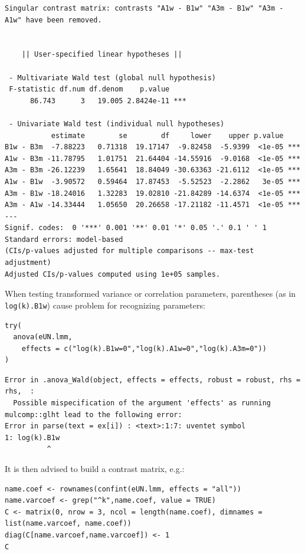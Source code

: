 \documentclass[12pt]{article}
\begin{document}
\begin{verbatim}
Singular contrast matrix: contrasts "A1w - B1w" "A3m - B1w" "A3m - A1w" have been removed. 


	|| User-specified linear hypotheses || 

 - Multivariate Wald test (global null hypothesis)
 F-statistic df.num df.denom    p.value    
      86.743      3   19.005 2.8424e-11 ***

 - Univariate Wald test (individual null hypotheses) 
           estimate        se        df     lower    upper p.value    
B1w - B3m  -7.88223   0.71318  19.17147  -9.82458  -5.9399  <1e-05 ***
A1w - B3m -11.78795   1.01751  21.64404 -14.55916  -9.0168  <1e-05 ***
A3m - B3m -26.12239   1.65641  18.84049 -30.63363 -21.6112  <1e-05 ***
A1w - B1w  -3.90572   0.59464  17.87453  -5.52523  -2.2862   3e-05 ***
A3m - B1w -18.24016   1.32283  19.02810 -21.84289 -14.6374  <1e-05 ***
A3m - A1w -14.33444   1.05650  20.26658 -17.21182 -11.4571  <1e-05 ***
---
Signif. codes:  0 '***' 0.001 '**' 0.01 '*' 0.05 '.' 0.1 ' ' 1
Standard errors: model-based
(CIs/p-values adjusted for multiple comparisons -- max-test adjustment)
Adjusted CIs/p-values computed using 1e+05 samples.
\end{verbatim}


When testing transformed variance or correlation parameters,
parentheses (as in \texttt{log(k).B1w}) cause problem for recognizing
parameters:
\lstset{language=r,label= ,caption= ,captionpos=b,numbers=none}
\begin{lstlisting}
try(
  anova(eUN.lmm,
	effects = c("log(k).B1w=0","log(k).A1w=0","log(k).A3m=0"))
)
\end{lstlisting}

\begin{verbatim}
Error in .anova_Wald(object, effects = effects, robust = robust, rhs = rhs,  : 
  Possible mispecification of the argument 'effects' as running mulcomp::glht lead to the following error: 
Error in parse(text = ex[i]) : <text>:1:7: uventet symbol
1: log(k).B1w
          ^
\end{verbatim}


It is then advised to build a contrast matrix, e.g.:
\lstset{language=r,label= ,caption= ,captionpos=b,numbers=none}
\begin{lstlisting}
name.coef <- rownames(confint(eUN.lmm, effects = "all"))
name.varcoef <- grep("^k",name.coef, value = TRUE)
C <- matrix(0, nrow = 3, ncol = length(name.coef), dimnames = list(name.varcoef, name.coef))
diag(C[name.varcoef,name.varcoef]) <- 1
C
\end{lstlisting}
\end{document}
